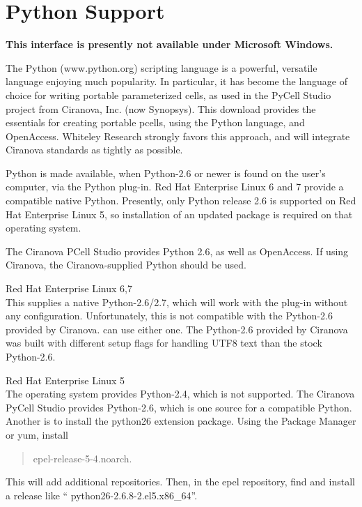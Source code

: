 \section{Python Support}
\label{pyplugin}

{\bf This interface is presently not available under Microsoft Windows.}

The Python ({\vt www.python.org}) scripting language is a powerful,
versatile language enjoying much popularity.  In particular, it has
become the language of choice for writing portable parameterized
cells, as used in the PyCell Studio project from Ciranova, Inc.  (now
Synopsys).
This download provides the essentials for creating portable pcells,
using the Python language, and OpenAccess.  Whiteley Research strongly
favors this approach, and will integrate Ciranova standards as tightly
as possible.

Python is made available, when Python-2.6 or newer is found on the
user's computer, via the Python plug-in.  Red Hat Enterprise Linux 6
and 7 provide a compatible native Python.  Presently, only Python
release 2.6 is supported on Red Hat Enterprise Linux 5, so
installation of an updated package is required on that operating
system.

The Ciranova PCell Studio provides Python 2.6, as well as OpenAccess. 
If using Ciranova, the Ciranova-supplied Python should be used.

\begin{description}
\item{Red Hat Enterprise Linux 6,7}\\
This supplies a native Python-2.6/2.7, which will work with the
plug-in without any configuration.
Unfortunately, this is not compatible with the Python-2.6 provided by
Ciranova.  {\Xic} can use either one.  The Python-2.6 provided by
Ciranova was built with different setup flags for handling UTF8 text
than the stock Python-2.6.

\item{Red Hat Enterprise Linux 5}\\
The operating system provides Python-2.4, which is not supported.  The
Ciranova PyCell Studio provides Python-2.6, which is one source for a
compatible Python.  Another is to install the {\vt python26} extension
package.  Using the {\cb Package Manager} or {\vt yum}, install
\begin{quote}
{\vt epel-release-5-4.noarch}.
\end{quote}
This will add additional repositories.  Then, in the {\vt epel}
repository, find and install a release like ``{\vt
python26-2.6.8-2.el5.x86\_64}''.
\end{description}

